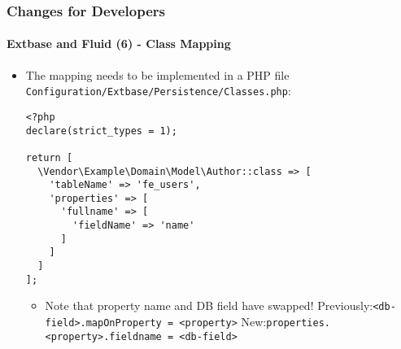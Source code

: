 
\begin{frame}[fragile]
	\frametitle{Changes for Developers}
	\framesubtitle{Extbase and Fluid (6) - Class Mapping}

	\lstset{basicstyle=\tiny\ttfamily}

	\begin{itemize}
		\item The mapping needs to be implemented in a PHP file \texttt{Configuration/Extbase/Persistence/Classes.php}:

\begin{lstlisting}
<?php
declare(strict_types = 1);

return [
  \Vendor\Example\Domain\Model\Author::class => [
    'tableName' => 'fe_users',
    'properties' => [
      'fullname' => [
        'fieldName' => 'name'
      ]
    ]
  ]
];
\end{lstlisting}

		\begin{itemize}\smaller
			\item[\ding{228}] Note that property name and DB field have swapped!\newline
				Previously:\tabto{1.6cm}\texttt{<db-field>.mapOnProperty = <property>}\newline
				New:\tabto{1.6cm}\texttt{properties.<property>.fieldname = <db-field>}
		\end{itemize}\normalsize

	\end{itemize}

\end{frame}


